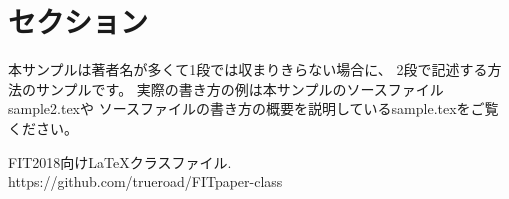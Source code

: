 \documentclass{FITpaper}
\begin{document}
\maketitle

\section{セクション}

本サンプルは著者名が多くて1段では収まりきらない場合に、
2段で記述する方法のサンプルです。
実際の書き方の例は本サンプルのソースファイルsample2.texや
ソースファイルの書き方の概要を説明しているsample.texをご覧ください。

\begin{thebibliography}{9}

  FIT2018向け\LaTeX クラスファイル. \\
  https://github.com/trueroad/FITpaper-class

\end{thebibliography}
\end{document}
